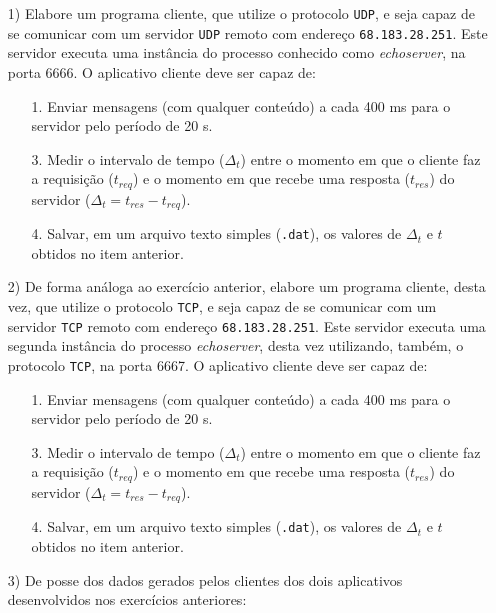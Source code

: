 \documentclass[12pt]{article}
\begin{document}
\begin{itemize}
  \item[1)] Elabore um programa cliente, que utilize o protocolo \texttt{UDP},
    e seja capaz de se comunicar com um servidor \texttt{UDP} remoto com
    endereço \texttt{68.183.28.251}. Este servidor executa uma instância do
    processo conhecido como \textit{echoserver}, na porta 6666. O aplicativo
    cliente deve ser capaz de:
    
    \begin{itemize}
      \item[1.] Enviar mensagens (com qualquer conteúdo) a cada 400 ms para o servidor
        pelo período de 20 s.
      \item[3.] Medir o intervalo de tempo ($ \Delta_t $) entre o momento em que
        o cliente faz a requisição ($ t_{req} $) e o momento em que recebe uma
        resposta ($ t_{res} $) do servidor ($ \Delta_t = t_{res} - t_{req} $).
      \item[4.] Salvar, em um arquivo texto simples (\texttt{.dat}), os valores de
        $ \Delta_t $ e $ t $ obtidos no item anterior.
    \end{itemize}

  \item[2)] De forma análoga ao exercício anterior, elabore um programa cliente,
    desta vez, que utilize o protocolo \texttt{TCP}, e seja capaz de se comunicar
    com um servidor \texttt{TCP} remoto com endereço \texttt{68.183.28.251}. Este
    servidor executa uma segunda instância do processo \textit{echoserver}, desta
    vez utilizando, também, o protocolo \texttt{TCP}, na porta 6667. O aplicativo
    cliente deve ser capaz de:

    \begin{itemize}
      \item[1.] Enviar mensagens (com qualquer conteúdo) a cada 400 ms para o servidor
        pelo período de 20 s.
      \item[3.] Medir o intervalo de tempo ($ \Delta_t $) entre o momento em que
        o cliente faz a requisição ($ t_{req} $) e o momento em que recebe uma
        resposta ($ t_{res} $) do servidor ($ \Delta_t = t_{res} - t_{req} $).
      \item[4.] Salvar, em um arquivo texto simples (\texttt{.dat}), os valores de
        $ \Delta_t $ e $ t $ obtidos no item anterior.
    \end{itemize}

  \item[3)] De posse dos dados gerados pelos clientes dos dois aplicativos desenvolvidos
    nos exercícios anteriores:


\end{itemize}
\end{document}
